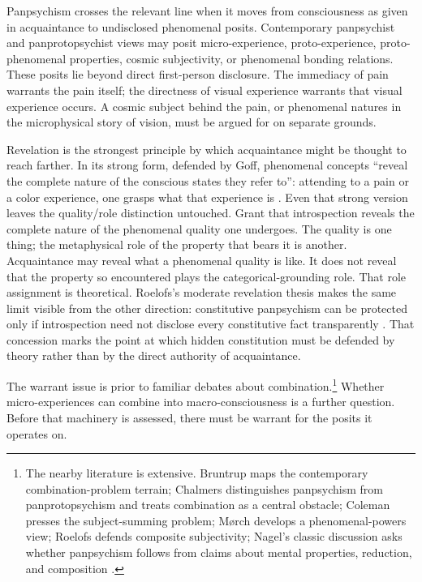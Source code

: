 Panpsychism crosses the relevant line when it moves from consciousness as given in acquaintance to undisclosed phenomenal posits. Contemporary panpsychist and panprotopsychist views may posit micro-experience, proto-experience, proto-phenomenal properties, cosmic subjectivity, or phenomenal bonding relations. These posits lie beyond direct first-person disclosure. The immediacy of pain warrants the pain itself; the directness of visual experience warrants that visual experience occurs. A cosmic subject behind the pain, or phenomenal natures in the microphysical story of vision, must be argued for on separate grounds.

Revelation is the strongest principle by which acquaintance might be thought to reach farther. In its strong form, defended by Goff, phenomenal concepts ``reveal the complete nature of the conscious states they refer to'': attending to a pain or a color experience, one grasps what that experience is \citep[106--132]{goff2017cfr}. Even that strong version leaves the quality/role distinction untouched. Grant that introspection reveals the complete nature of the phenomenal quality one undergoes. The quality is one thing; the metaphysical role of the property that bears it is another. Acquaintance may reveal what a phenomenal quality is like. It does not reveal that the property so encountered plays the categorical-grounding role. That role assignment is theoretical. Roelofs's moderate revelation thesis makes the same limit visible from the other direction: constitutive panpsychism can be protected only if introspection need not disclose every constitutive fact transparently \citep{roelofs2020revelation}. That concession marks the point at which hidden constitution must be defended by theory rather than by the direct authority of acquaintance.

The warrant issue is prior to familiar debates about combination.\footnote{The nearby literature is extensive. Bruntrup maps the contemporary combination-problem terrain; Chalmers distinguishes panpsychism from panprotopsychism and treats combination as a central obstacle; Coleman presses the subject-summing problem; M{\o}rch develops a phenomenal-powers view; Roelofs defends composite subjectivity; Nagel's classic discussion asks whether panpsychism follows from claims about mental properties, reduction, and composition \citep{bruntrup2017,chalmers2015,chalmers2017combination,coleman2014,morch2018,morchForthcoming,roelofs2019,nagel1979panpsychism}.} Whether micro-experiences can combine into macro-consciousness is a further question. Before that machinery is assessed, there must be warrant for the posits it operates on.

